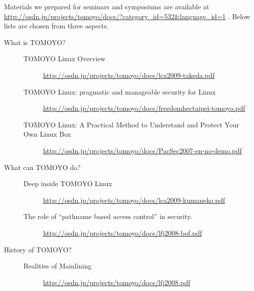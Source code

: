 \documentclass[a4paper,8pt,english]{sphinxmanual}
\begin{document}
Materials we prepared for seminars and symposiums are available at
\href{http://osdn.jp/projects/tomoyo/docs/?category\_id=532\&language\_id=1}{http://osdn.jp/projects/tomoyo/docs/?category\_id=532\&language\_id=1} .
Below lists are chosen from three aspects.
\begin{description}
\item[{What is TOMOYO?}] \leavevmode\begin{description}
\item[{TOMOYO Linux Overview}] \leavevmode
\href{http://osdn.jp/projects/tomoyo/docs/lca2009-takeda.pdf}{http://osdn.jp/projects/tomoyo/docs/lca2009-takeda.pdf}

\item[{TOMOYO Linux: pragmatic and manageable security for Linux}] \leavevmode
\href{http://osdn.jp/projects/tomoyo/docs/freedomhectaipei-tomoyo.pdf}{http://osdn.jp/projects/tomoyo/docs/freedomhectaipei-tomoyo.pdf}

\item[{TOMOYO Linux: A Practical Method to Understand and Protect Your Own Linux Box}] \leavevmode
\href{http://osdn.jp/projects/tomoyo/docs/PacSec2007-en-no-demo.pdf}{http://osdn.jp/projects/tomoyo/docs/PacSec2007-en-no-demo.pdf}

\end{description}

\item[{What can TOMOYO do?}] \leavevmode\begin{description}
\item[{Deep inside TOMOYO Linux}] \leavevmode
\href{http://osdn.jp/projects/tomoyo/docs/lca2009-kumaneko.pdf}{http://osdn.jp/projects/tomoyo/docs/lca2009-kumaneko.pdf}

\item[{The role of ``pathname based access control'' in security.}] \leavevmode
\href{http://osdn.jp/projects/tomoyo/docs/lfj2008-bof.pdf}{http://osdn.jp/projects/tomoyo/docs/lfj2008-bof.pdf}

\end{description}

\item[{History of TOMOYO?}] \leavevmode\begin{description}
\item[{Realities of Mainlining}] \leavevmode
\href{http://osdn.jp/projects/tomoyo/docs/lfj2008.pdf}{http://osdn.jp/projects/tomoyo/docs/lfj2008.pdf}

\end{description}

\end{description}
\end{document}
